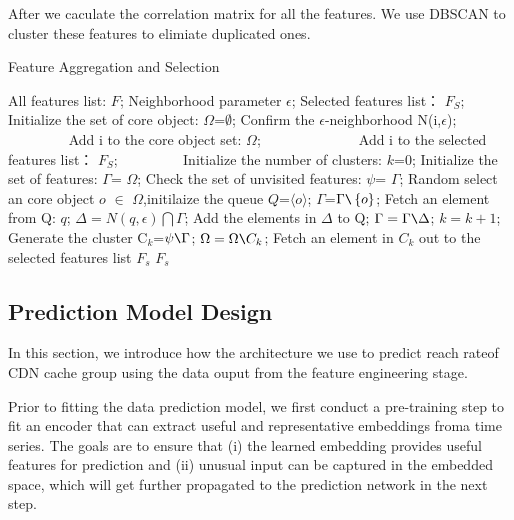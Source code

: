 \documentclass[5p]{elsarticle}
\newcommand{\dabiaolv}{reach rate}
\begin{document}
After we caculate the correlation matrix for all the features. We use DBSCAN to cluster these features to elimiate duplicated ones.

\begin{algorithm}[t]
\caption{Feature Aggregation and Selection} 
\begin{algorithmic}[1]
\Require  
    All features list: $F$;
    Neighborhood parameter $\epsilon$; 
\Ensure  
    Selected features list： $F_S$;  
\State Initialize the set of core object:  $\Omega$=$\emptyset$;
    \State Confirm the $\epsilon$-neighborhood\; N(i,$\epsilon$);
　　　　        \State Add i to the core object set: $\Omega$;
　　        \Else
　　　　        \State Add i to the selected features list： $F_S$;
　　　　    \EndIf
\EndFor
\State Initialize the number of clusters:  $k$=0;
\State Initialize the set of features:  $\Gamma$= $\Omega$;
\While{$\Omega\neq\emptyset$}
\State Check the set of unvisited features: $\psi$= $\Gamma$;
    \State Random select an core object $o$ $\in$ $\Omega$,initilaize the queue $Q$=$\langle o \rangle$;
\State $\Gamma$=$\Gamma \verb|\|\left\{o\right\}$;
    \State Fetch an element from Q: $q$;
    \State $\Delta=N(q,\epsilon)\bigcap\Gamma$;
    \State Add the elements in $\Delta$ to Q;
    \State  $\Gamma= \Gamma\verb|\|\Delta$;
\EndWhile
\State $k=k+1$;
\State Generate the cluster C$_k$=$\psi\verb|\|\Gamma$;
\State $\Omega=\Omega\verb|\|C_k$;
\EndWhile
{}
    \State Fetch an element in $C_k$ out to the selected features list $F_s$
\EndFor
\State \Return $F_s$
\end{algorithmic}
\end{algorithm}


\subsection{Prediction Model Design}

In this section, we introduce how the architecture we use to predict \dabiaolv of CDN cache group using the data ouput from the feature engineering stage. 

Prior to fitting the data prediction model, we first conduct a pre-training step to fit an encoder that can extract useful and representative embeddings froma  time  series.  The  goals  are  to  ensure  that  (i)  the  learned embedding  provides  useful  features  for  prediction  and  (ii) unusual input can be captured in the embedded space, which will get further propagated to the prediction network in the next step.
\end{document}
